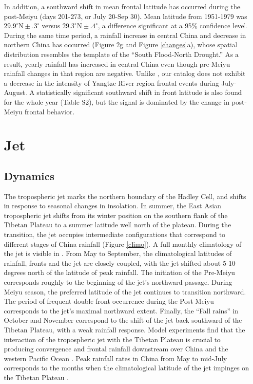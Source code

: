 \documentclass[draft,grl]{AGUTeX}
\begin{document}
\begin{article}
	In addition, a southward shift in mean frontal latitude has occurred during the post-Meiyu (days 201-273, or July 20-Sep 30). Mean latitude from 1951-1979 was $29.9^\circ \textrm{N} \pm .3^\circ$ versus $29.3^\circ \textrm{N} \pm .4^\circ$, a difference significant at a 95\% confidence level. During the same time period, a rainfall increase in central China and decrease in northern China has occurred (Figure 2g and Figure \ref{changes}a), whose spatial distribution resembles the template of the ``South Flood-North Drought.'' As a result, yearly rainfall has increased in central China even though pre-Meiyu rainfall changes in that region are negative. Unlike \citet{Yu2010},  our catalog does not exhibit a decrease in the intensity of Yangtze River region frontal events during July-August. A statistically significant southward shift in front latitude is also found for the whole year (Table S2), but the signal is dominated by the change in post-Meiyu frontal behavior.
	
\section{Jet}

\subsection{Dynamics}

	The tropospheric jet marks the northern boundary of the Hadley Cell, and shifts in response to seasonal changes in insolation. In summer, the East Asian tropospheric jet shifts from its winter position on the southern flank of the Tibetan Plateau to a summer latitude well north of the plateau. During the transition, the jet occupies intermediate configurations that correspond to different stages of China rainfall (Figure \ref{climo}). A full monthly climatology of the jet is visible in \citet{Schiemann2009}. From May to September,  the climatological latitudes of rainfall, fronts and the jet are closely coupled, with the jet shifted about 5-10 degrees north of the latitude of peak rainfall. The initiation of the Pre-Meiyu corresponds roughly to the beginning of the jet's northward passage. During Meiyu season, the preferred latitude of the jet continues to transition northward. The period of frequent double front occurrence during the Post-Meiyu corresponds to the jet's maximal northward extent. Finally, the ``Fall rains'' in October and November correspond to the shift of the jet back southward of the Tibetan Plateau, with a weak rainfall response. Model experiments find that the interaction of the tropospheric jet with the Tibetan Plateau is crucial to producing convergence and frontal rainfall downstream over China and the western Pacific Ocean \citep{Molnar2010,Sampe2010,Chen2014}. Peak rainfall rates in China from May to mid-July corresponds to the months when the climatological latitude of the jet impinges on the Tibetan Plateau \citep{Schiemann2009}.
	

\end{article}
\end{document}
